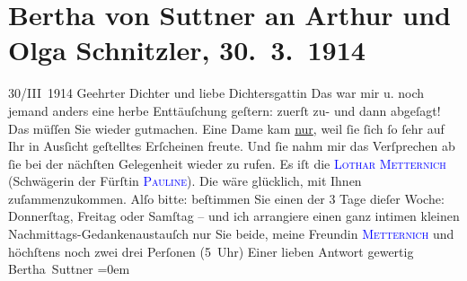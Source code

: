 

               \section[Bertha von Suttner an Arthur und Olga Schnitzler, 30. 3. 1914]{ Bertha von Suttner an Arthur und Olga Schnitzler,
                    30. 3. 1914}\nopagebreak{}\rehead{ }\normalsize\beginnumbering{} \toendnotes[C]{\smallbreak\pagebreak[2]} 
\toendnotes[C]{\smallbreak}\pstart
           \raggedleft{}{\pb}30/III 1914\pend
           \pstart\center{}Geehrter Dichter und liebe Dichtersgattin\pend\pstart
           Das war mir u. noch jemand anders eine herbe Enttäuſchung geſtern: zuerſt zu- und
                    dann abgeſagt! Das müſſen Sie wieder gutmachen. Eine Dame kam \uline{nur}, weil ſie ſich ſo ſehr auf Ihr in Ausſicht
                    geſtelltes Erſcheinen  freute. Und ſie nahm
                    mir das Verſprechen ab ſie bei der nächſten Gelegenheit wieder zu rufen. Es iſt
                    die \label{K_L02170_1v}\label{K_L02170_1h}{ }\textcolor{blue}{\textsc{Lothar Metternich}}{}\ledrightnote{\textcolor{blue}{Karoline Franziska von Metternich-Winneburg}}
                    (Schwägerin der Fürſtin \textcolor{blue}{\textsc{Pauline}}{}\ledrightnote{\textcolor{blue}{Pauline von Metternich-Sándor}}). Die wäre glücklich, mit Ihnen zuſammenzukommen.
                    Alſo bitte: beſtimmen Sie einen der 3 Tage dieſer Woche: Donnerſtag, Freitag
                    oder Samſtag – und {\pb}ich arrangiere einen ganz
                    intimen kleinen Nachmittags-Gedankenaustauſch nur Sie beide, meine Freundin \textcolor{blue}{\textsc{Metternich}}{}\ledrightnote{\textcolor{blue}{Karoline Franziska von Metternich-Winneburg}} und
                    höchſtens noch zwei drei Perſonen (5 Uhr)\pend
           \pstart
           Einer lieben Antwort gewertig{\\[\baselineskip]}\spacefill\mbox{Bertha Suttner}\pend
           \leftskip=0em{}\endnumbering{}  
      